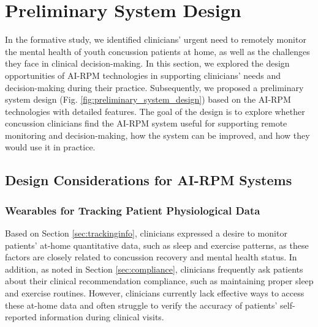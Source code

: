 
\section{Preliminary System Design}
In the formative study, we identified clinicians' urgent need to remotely monitor the mental health of youth concussion patients at home, as well as the challenges they face in clinical decision-making.
In this section, we explored the design opportunities of AI-RPM technologies in supporting clinicians’ needs and decision-making during their practice. 
Subsequently, we proposed a preliminary system design (Fig. \ref{fig:preliminary_system_design}) based on the AI-RPM technologies with detailed features. 
The goal of the design is to explore whether concussion clinicians find the AI-RPM system useful for supporting remote monitoring and decision-making, how the system can be improved, and how they would use it in practice.

\subsection{Design Considerations for AI-RPM Systems}

\subsubsection{Wearables for Tracking Patient Physiological Data}
\label{sec:wearblesforsleepandactivitiestracking}

Based on Section \ref{sec:trackinginfo}, clinicians expressed a desire to monitor patients’ at-home quantitative data, such as sleep and exercise patterns, as these factors are closely related to concussion recovery and mental health status. 
In addition, as noted in Section \ref{sec:compliance}, clinicians frequently ask patients about their clinical recommendation compliance, such as maintaining proper sleep and exercise routines.
However, clinicians currently lack effective ways to access these at-home data and often struggle to verify the accuracy of patients’ self-reported information during clinical visits.

